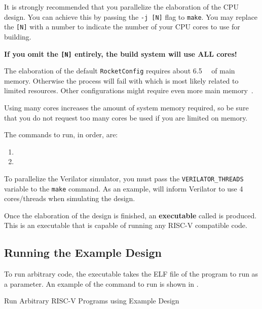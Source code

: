 \begin{blackbox}
  It is strongly recommended that you parallelize the elaboration of the CPU design.
  You can achieve this by passing the \texttt{-j [N]} flag to \texttt{make}.
  You may replace the \texttt{[N]} with a number to indicate the number of your CPU cores to use for building.

  \textbf{If you omit the \texttt{[N]} entirely, the build system will use ALL cores!}

  The elaboration of the default \texttt{RocketConfig} requires about \SI{6.5}{\giga\byte} of main memory.
  Otherwise the process will fail with  which is most likely related to limited resources.
  Other configurations might require even more main memory~\cite{chipyard}.

  Using many cores increases the amount of system memory required, so be sure that you do not request too many cores be used if you are limited on memory.
\end{blackbox}

The commands to run, in order, are:
\begin{enumerate}
\item {}
\item {}
\end{enumerate}

\begin{blackbox}
  To parallelize the Verilator simulator, you must pass the \texttt{VERILATOR\_THREADS} variable to the \texttt{make} command.
  As an example,  will inform Verilator to use 4 cores/threads when simulating the design.
\end{blackbox}

Once the elaboration of the design is finished, an \textbf{executable} called  is produced.
This is an executable that is capable of running any RISC-V compatible code.

\subsection{Running the Example Design}\label{sec:Running_Example_Design}
To run arbitrary code, the executable takes the ELF file of the program to run as a parameter.
An example of the command to run is shown in .

\begin{listing}[h!tbp]
\caption{Run Arbitrary RISC-V Programs using Example Design}
\label{lst:Running_Example_Design}
\end{listing}

